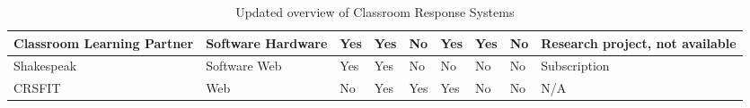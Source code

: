 \begin{landscape}
\begin{center}
\begin{table}[H]
\begin{tabularx}{\paperwidth}{ |X|X|X|X|X|X|X|X|X| }
              Classroom Learning Partner & Software \newline Hardware & Yes & Yes & \cellcolor{red!25}No & \cellcolor{green!25}Yes & Yes & No & Research project, not available \\ \hline
              Shakespeak            & Software \newline Web & Yes & Yes & \cellcolor{red!25}No & \cellcolor{red!25}No & No & No & Subscription \\ \Xhline{2\arrayrulewidth}
              CRSFIT                & Web & No & Yes & \cellcolor{green!25}Yes & \cellcolor{green!25}Yes & No & No & N/A \\ \hline
            
            \end{tabularx}
            \caption{Updated overview of Classroom Response Systems}\label{tab:overview-2}
        \end{table}
    \end{center}
\end{landscape}